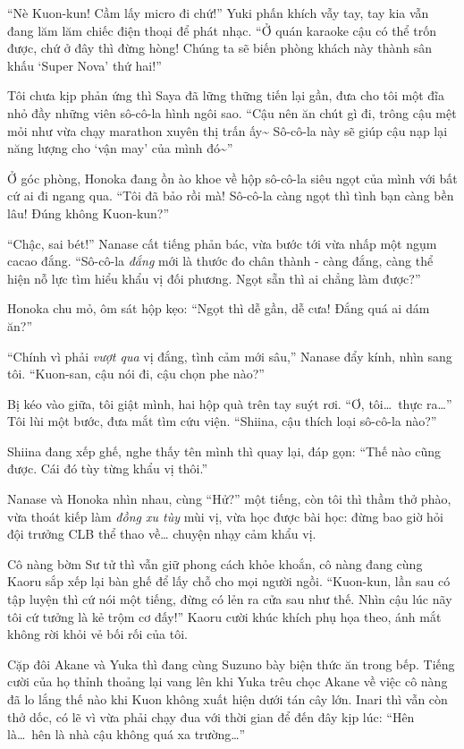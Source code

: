 \documentclass[../main.tex]{subfiles}
\begin{document}
``Nè Kuon-kun! Cầm lấy micro đi chứ!'' Yuki phấn khích vẫy tay, tay kia vẫn đang lăm lăm chiếc điện thoại để phát nhạc. ``Ở quán karaoke cậu  có thể trốn được, chứ ở đây thì đừng hòng! Chúng ta sẽ biến phòng khách này thành sân khấu `Super Nova' thứ hai!''

Tôi chưa kịp phản ứng thì Saya đã lững thững tiến lại gần, đưa cho tôi một đĩa nhỏ đầy những viên sô-cô-la hình ngôi sao. ``Cậu nên ăn chút gì đi, trông cậu mệt mỏi như vừa chạy marathon xuyên thị trấn ấy\~{} Sô-cô-la này sẽ giúp cậu nạp lại năng lượng cho `vận may' của mình đó\~{}''

Ở góc phòng, Honoka đang ồn ào khoe về hộp sô-cô-la siêu ngọt của mình với bất cứ ai đi ngang qua. ``Tôi đã bảo rồi mà! Sô-cô-la càng ngọt thì tình bạn càng bền lâu! Đúng không Kuon-kun?''

``Chậc, sai bét!'' Nanase cất tiếng phản bác, vừa bước tới vừa nhấp một ngụm cacao đắng. ``Sô-cô-la \emph{đắng} mới là thước đo chân thành - càng đắng, càng thể hiện nỗ lực tìm hiểu khẩu vị đối phương. Ngọt sẵn thì ai chẳng làm được?''

Honoka chu mỏ, ôm sát hộp kẹo: ``Ngọt thì dễ gần, dễ cưa! Đắng quá ai dám ăn?''

``Chính vì phải \emph{vượt qua} vị đắng, tình cảm mới sâu,'' Nanase đẩy kính, nhìn sang tôi. ``Kuon-san, cậu nói đi, cậu chọn phe nào?''

Bị kéo vào giữa, tôi giật mình, hai hộp quà trên tay suýt rơi. ``Ơ, tôi\dots\ thực ra\dots'' Tôi lùi một bước, đưa mắt tìm cứu viện. ``Shiina, cậu thích loại sô-cô-la nào?''

Shiina đang xếp ghế, nghe thấy tên mình thì quay lại, đáp gọn: ``Thế nào cũng được. Cái đó tùy từng khẩu vị thôi.''

Nanase và Honoka nhìn nhau, cùng ``Hử?'' một tiếng, còn tôi thì thầm thở phào, vừa thoát kiếp làm \emph{đồng xu tùy} mùi vị, vừa học được bài học: đừng bao giờ hỏi đội trưởng CLB thể thao về… chuyện nhạy cảm khẩu vị.

Cô nàng bờm Sư tử thì vẫn giữ phong cách khỏe khoắn, cô nàng đang cùng Kaoru sắp xếp lại bàn ghế để lấy chỗ cho mọi người ngồi. ``Kuon-kun, lần sau có tập luyện thì cứ nói một tiếng, đừng có lẻn ra cửa sau như thế. Nhìn cậu lúc nãy tôi cứ tưởng là kẻ trộm cơ đấy!'' Kaoru cười khúc khích phụ họa theo, ánh mắt không rời khỏi vẻ bối rối của tôi.

Cặp đôi Akane và Yuka thì đang cùng Suzuno bày biện thức ăn trong bếp. Tiếng cười của họ thỉnh thoảng lại vang lên khi Yuka trêu chọc Akane về việc cô nàng đã lo lắng thế nào khi Kuon không xuất hiện dưới tán cây lớn. Inari thì vẫn còn thở dốc, có lẽ vì vừa phải chạy đua với thời gian để đến đây kịp lúc: ``Hên là\dots\ hên là nhà cậu không quá xa trường\dots''
\end{document}
